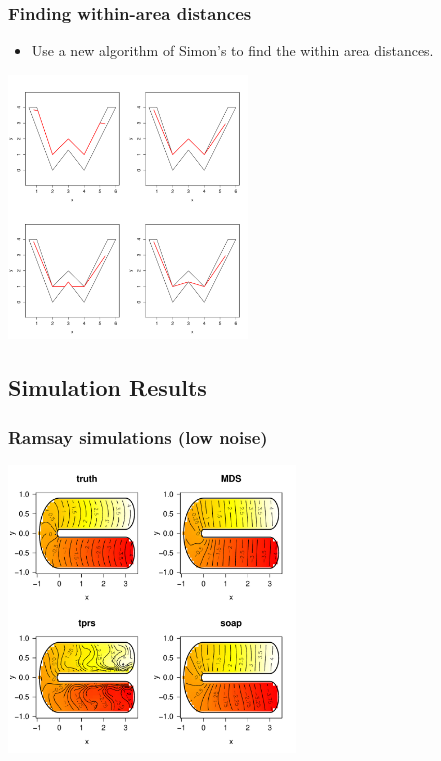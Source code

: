 \documentclass[ignorenonframetext]{beamer} %
\newcommand{\bi}{\begin{itemize}}
\newcommand{\ei}{\end{itemize}}
\begin{document}
\begin{frame}
	\frametitle{Finding within-area distances}
       \bi
         \item Use a new algorithm of Simon's to find the within area distances.
        \ei
            \centering
              \includegraphics[width=2.5in]{figs/doubleyah-example.pdf}\\
\end{frame}



\subsection{Simulation Results}

\begin{frame}
	\frametitle{Ramsay simulations (low noise)}
            \centering
              \includegraphics[width=3in]{figs/ramsay-low.pdf}\\
\end{frame}
\end{document}
